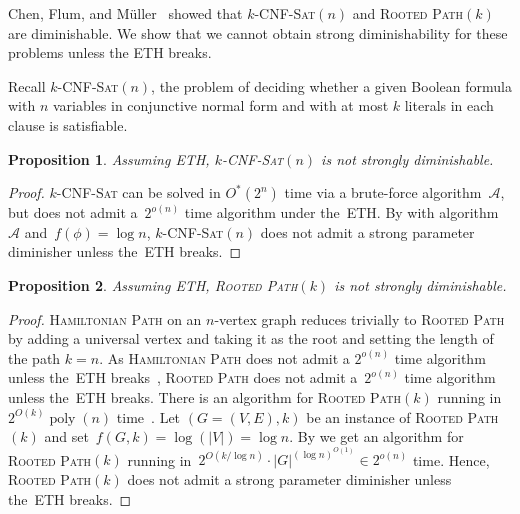 \documentclass[11pt,a4,USenglish]{article}
\newcommand{\prob}[1]{\textsc{#1}}
\newcommand{\pprob}[2]{\prob{#1}$(#2)$}
\newcommand{\ETH}{\textnormal{ETH}}
\DeclareMathOperator{\poly}{poly}
\theoremstyle{definition}
\theoremstyle{plain}
\newtheorem{proposition}{Proposition}
\theoremstyle{remark}
\newcommand{\calA}{\mathcal{A}}
\begin{document}
Chen, Flum, and M\"{u}ller~\cite{chen2011lower} showed that \pprob{$k$-CNF-Sat}{n} and \pprob{Rooted Path}{k} are diminishable. We show that we cannot obtain strong diminishability for these problems unless the \ETH{} breaks. 
%

%
  Recall \pprob{$k$-CNF-Sat}{n}, the problem of deciding whether a given Boolean formula with $n$ variables in conjunctive normal form and with at most $k$ literals in each clause is satisfiable.

  \begin{proposition}
  Assuming \ETH{}, \pprob{$k$-CNF-Sat}{n} is not strongly diminishable.
  \end{proposition}
  \begin{proof}
\prob{$k$-CNF-Sat} can be solved in $O^*(2^{n})$ time via a brute-force algorithm~$\calA$, but does not admit a~$2^{o(n)}$ time algorithm under the~\ETH{}.
    By  with algorithm~$\calA$ and~$f(\phi)=\log n$, \pprob{$k$-CNF-Sat}{n} does not admit a strong parameter diminisher unless the~\ETH{} breaks.
  \end{proof}

\begin{proposition}
 Assuming \ETH{}, \pprob{Rooted Path}{k} is not strongly diminishable.
\end{proposition}
\begin{proof}
 \prob{Hamiltonian Path} on an $n$-vertex graph reduces trivially to \prob{Rooted Path} by adding a universal vertex and taking it as the root and setting the length of the path $k=n$.
 As \prob{Hamiltonian Path} does not admit a $2^{o(n)}$ time algorithm unless the~\ETH{} breaks~\cite{lokshtanov2011lower}, \prob{Rooted Path} does not admit a~$2^{o(n)}$ time algorithm unless the~\ETH{} breaks.
 There is an algorithm for \pprob{Rooted Path}{k} running in $2^{O(k)}\poly(n)$ time~\cite{AlonYZ95}. Let $(G=(V,E), k)$ be an instance of \pprob{Rooted Path}{k} and set~$f(G, k)=\log(|V|)=\log n$. By  we get an algorithm for \pprob{Rooted Path}{k} running in~$2^{O(k/\log n)}\cdot |G|^{(\log n)^{O(1)}}\in 2^{o(n)}$ time.
 Hence, \pprob{Rooted Path}{k} does not admit a strong parameter diminisher unless the~\ETH{} breaks.
\end{proof}
\end{document}
